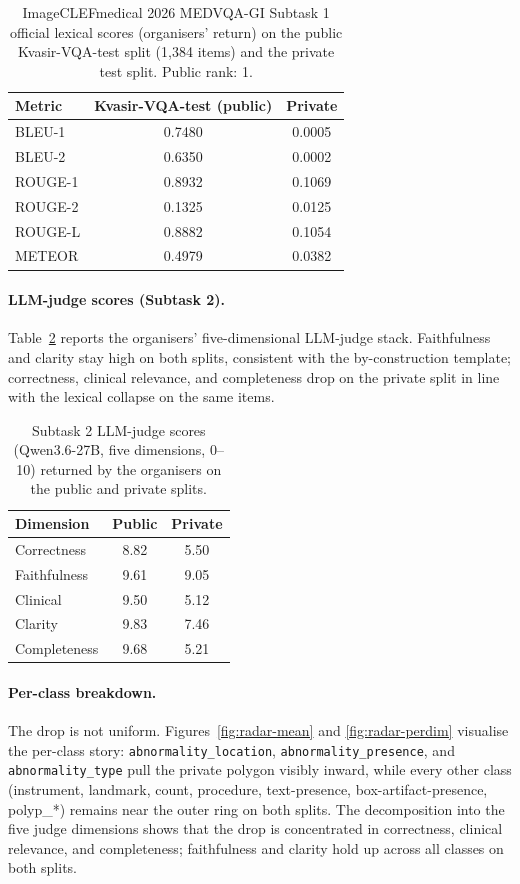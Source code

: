 \documentclass{ceurart}
\begin{document}
\begin{table}[H]
\centering\small
\caption{ImageCLEFmedical 2026 MEDVQA-GI Subtask 1 official lexical
scores (organisers' return) on the public Kvasir-VQA-test split
(1{,}384 items) and the private test split. Public rank: 1.}
\label{tab:lex}
\begin{tabular}{lcc}
\toprule
\textbf{Metric} & \textbf{Kvasir-VQA-test (public)} & \textbf{Private} \\
\midrule
BLEU-1 & 0.7480 & 0.0005 \\
BLEU-2 & 0.6350 & 0.0002 \\
ROUGE-1 & 0.8932 & 0.1069 \\
ROUGE-2 & 0.1325 & 0.0125 \\
ROUGE-L & 0.8882 & 0.1054 \\
METEOR & 0.4979 & 0.0382 \\
\bottomrule
\end{tabular}
\end{table}

\paragraph{LLM-judge scores (Subtask 2).}
Table~\ref{tab:judge} reports the organisers' five-dimensional
LLM-judge stack. Faithfulness and clarity stay high on both splits,
consistent with the by-construction template; correctness, clinical
relevance, and completeness drop on the private split in line with
the lexical collapse on the same items.

\begin{table}[H]
\centering\small
\caption{Subtask 2 LLM-judge scores (Qwen3.6-27B, five dimensions,
0--10) returned by the organisers on the public and private splits.}
\label{tab:judge}
\begin{tabular}{lcc}
\toprule
\textbf{Dimension} & \textbf{Public} & \textbf{Private} \\
\midrule
Correctness  & 8.82 & 5.50 \\
Faithfulness & 9.61 & 9.05 \\
Clinical     & 9.50 & 5.12 \\
Clarity      & 9.83 & 7.46 \\
Completeness & 9.68 & 5.21 \\
\bottomrule
\end{tabular}
\end{table}

\FloatBarrier
\paragraph{Per-class breakdown.}
The drop is not uniform. Figures~\ref{fig:radar-mean} and
\ref{fig:radar-perdim} visualise the per-class story:
\texttt{abnormality\_location}, \texttt{abnormality\_presence}, and
\texttt{abnormality\_type} pull the private polygon visibly inward,
while every other class (instrument, landmark, count, procedure,
text-presence, box-artifact-presence, polyp\_*) remains near the
outer ring on both splits. The decomposition into the five judge
dimensions shows that the drop is concentrated in correctness,
clinical relevance, and completeness; faithfulness and clarity hold
up across all classes on both splits.
\end{document}

